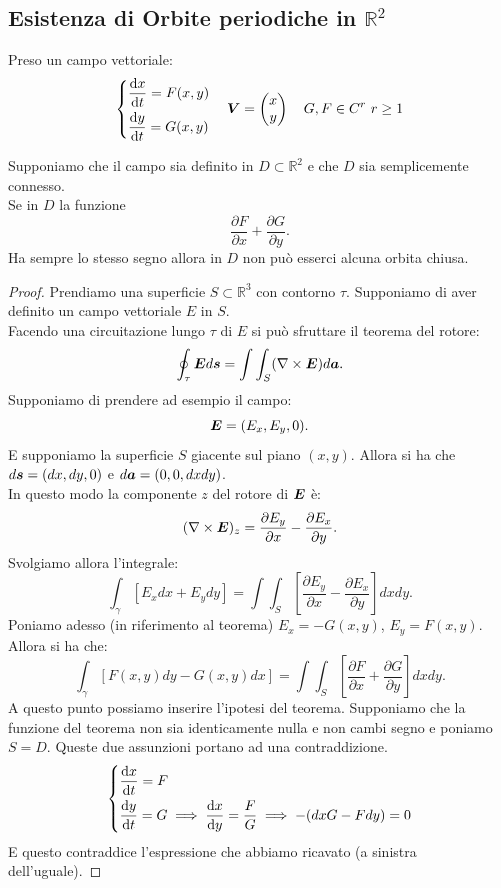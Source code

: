 \subsection{Esistenza di Orbite periodiche in $\mathbb{R}^2$}%
\label{sub:Esistenza di Orbite periodiche in} 
Preso un campo vettoriale:
\[
\begin{dcases}
    \frac{\text{d} x}{\text{d} t} = F(x, y) \\
    \frac{\text{d} y}{\text{d} t} = G(x, y) 
\end{dcases}
    \quad  \boldsymbol{V} = \begin{pmatrix} x \\ y \end{pmatrix} \quad 
    G, F \in C^r \ r\ge 1
\]
\begin{thm}
    Supponiamo che il campo sia definito in $D \subset \mathbb{R}^2$  e che $D$  sia semplicemente connesso.\\
    Se in $D$  la funzione 
    \[
        \frac{\partial F}{\partial x} + \frac{\partial G}{\partial y} 
    .\] 
    Ha sempre lo stesso segno allora in $D$ non può esserci alcuna orbita chiusa.
\end{thm}
\noindent
\begin{proof}
    Prendiamo una superficie $S \subset \mathbb{R}^3$ con contorno $\tau$. Supponiamo di aver definito un campo vettoriale $E$ in $S$.\\
    Facendo una circuitazione lungo $\tau$ di $E$ si può sfruttare il teorema del rotore:
    \[
	\oint_{\tau} \boldsymbol{E}d\boldsymbol{s} = \int \int_S (\nabla \times \boldsymbol{E}) d\boldsymbol{a}
    .\] 
    Supponiamo di prendere ad esempio il campo:
    \[
	\boldsymbol{E} = (E_x, E_y, 0)
    .\] 
    E supponiamo la superficie $S$ giacente sul piano $(x, y)$. Allora si ha che $d\boldsymbol{s} = (dx, dy, 0) $ e $d\boldsymbol{a} = (0 , 0, dxdy) $.\\
    In questo modo la componente $z$ del rotore di $\boldsymbol{E}$ è:
    \[
	(\nabla \times \boldsymbol{E})_z = \frac{\partial E_y}{\partial x} - \frac{\partial E_x}{\partial y} 
    .\] 
    Svolgiamo allora l'integrale:
    \[
        \int_\gamma  \left[E_x dx + E_ydy\right] = \int \int_S \left[\frac{\partial E_y}{\partial x} - \frac{\partial E_x}{\partial y} \right]dxdy
    .\] 
    Poniamo adesso (in riferimento al teorema) $E_x = -G(x, y)$, $E_y = F(x, y) $. Allora si ha che:
    \[
	\int_\gamma  \left[F(x, y) dy - G(x, y) dx\right] = 
	\int \int_S \left[\frac{\partial F}{\partial x} + \frac{\partial G}{\partial y} \right]dxdy
    .\] 
    A questo punto possiamo inserire l'ipotesi del teorema. Supponiamo che la funzione del teorema non sia identicamente nulla e non cambi segno e poniamo $S = D$. Queste due assunzioni portano ad una contraddizione.
    \[
    \begin{dcases}
    \frac{\text{d} x}{\text{d} t} = F\\
    \frac{\text{d} y}{\text{d} t} = G 
    \implies  \frac{\text{d} x}{\text{d} y} = \frac{F}{G}\implies 
    -(dxG-Fdy) = 0
    \end{dcases}
    \]
    E questo contraddice l'espressione che abbiamo ricavato (a sinistra dell'uguale).
\end{proof}
